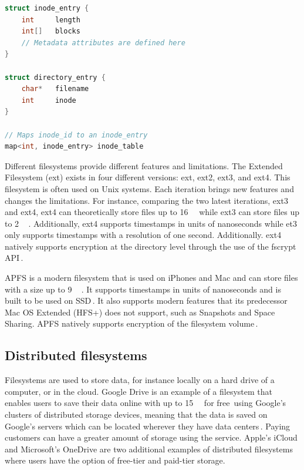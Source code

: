 \begin{minipage}{\linewidth}
\begin{lstlisting}[language=c, caption={Pseudocode of a minimalistic inode filesystem structure}, label=lst:inode_fs]
struct inode_entry {
	int 	length
	int[]	blocks
	// Metadata attributes are defined here
}

struct directory_entry {
	char*   filename
	int     inode
}

// Maps inode_id to an inode_entry
map<int, inode_entry> inode_table

\end{lstlisting}
\end{minipage}

Different filesystems provide different features and limitations. The Extended Filesystem (ext) exists in four different versions: ext, ext2, ext3, and ext4. This filesystem is often used on Unix systems. Each iteration brings new features and changes the limitations. For instance, comparing the two latest iterations, ext3 and ext4, ext4 can theoretically store files up to \SI{16}{\tebi\byte} while ext3 can store files up to \SI{2}{\tebi\byte}\,\cite{salterUnderstandingLinuxFilesystems2018}. Additionally, ext4 supports timestamps in units of nanoseconds while et3 only supports timestamps with a resolution of one second. Additionally. ext4 natively supports encryption at the directory level through the use of the fscrypt API\,\cite{FscryptArchWiki}.

\gls{APFS} is a modern filesystem that is used on iPhones and Mac and can store files with a size up to \SI{9}{\exa\byte}\,\cite{igotofferAPFSAppleFile2017}. It supports timestamps in units of nanoseconds and is built to be used on \gls{SSD}\,\cite{nelsonWhatAPFSDoes}. It also supports modern features that its predecessor Mac OS Extended (HFS+) does not support, such as Snapshots and Space Sharing. \gls{APFS} natively supports encryption of the filesystem volume\,\cite{appleinc.FileSystemFormats}.

\subsection{Distributed filesystems}
Filesystems are used to store data, for instance locally on a hard drive of a computer, or in the cloud. Google Drive is an example of a filesystem that enables users to save their data online with up to \SI{15}{\giga\byte} for free\,\cite{CloudStorageWork} using Google's clusters of distributed storage devices, meaning that the data is saved on Google's servers which can be located wherever they have data centers\,\cite{DistributedStorageWhat}. Paying customers can have a greater amount of storage using the service. Apple's iCloud and Microsoft's OneDrive are two additional examples of distributed filesystems where users have the option of free-tier and paid-tier storage.

